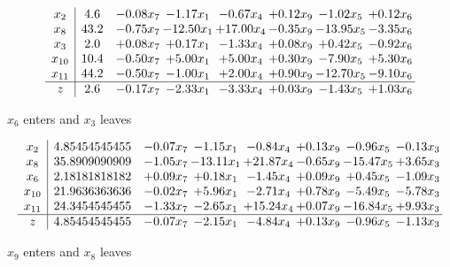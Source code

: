 \documentclass[8pt]{article}
\begin{document}
 \[\begin{array}{c| c c@{\hskip 2pt} c@{\hskip 2pt} c@{\hskip 2pt} c@{\hskip 2pt} c@{\hskip 2pt} c@{\hskip 2pt} }
 x_{2}   &  4.6 & -0.08 x_{7} & -1.17 x_{1} & -0.67 x_{4} & +  0.12 x_{9} & -1.02 x_{5} & +  0.12 x_{6}\\
 x_{8}   &  43.2 & -0.75 x_{7} & -12.50 x_{1} & + 17.00 x_{4} & -0.35 x_{9} & -13.95 x_{5} & -3.35 x_{6}\\
 x_{3}   &  2.0 & +  0.08 x_{7} & +  0.17 x_{1} & -1.33 x_{4} & +  0.08 x_{9} & +  0.42 x_{5} & -0.92 x_{6}\\
 x_{10}   &  10.4 & -0.50 x_{7} & +  5.00 x_{1} & +  5.00 x_{4} & +  0.30 x_{9} & -7.90 x_{5} & +  5.30 x_{6}\\
 x_{11}   &  44.2 & -0.50 x_{7} & -1.00 x_{1} & +  2.00 x_{4} & +  0.90 x_{9} & -12.70 x_{5} & -9.10 x_{6}\\
\hline
z    &  2.6 & -0.17 x_{7} & -2.33 x_{1} & -3.33 x_{4} & +  0.03 x_{9} & -1.43 x_{5} & +  1.03 x_{6}\\
\end{array}\]


 $ x_{6} $ enters and $ x_{3} $ leaves 

 \[\begin{array}{c| c c@{\hskip 2pt} c@{\hskip 2pt} c@{\hskip 2pt} c@{\hskip 2pt} c@{\hskip 2pt} c@{\hskip 2pt} }
 x_{2}   &  4.85454545455 & -0.07 x_{7} & -1.15 x_{1} & -0.84 x_{4} & +  0.13 x_{9} & -0.96 x_{5} & -0.13 x_{3}\\
 x_{8}   &  35.8909090909 & -1.05 x_{7} & -13.11 x_{1} & + 21.87 x_{4} & -0.65 x_{9} & -15.47 x_{5} & +  3.65 x_{3}\\
 x_{6}   &  2.18181818182 & +  0.09 x_{7} & +  0.18 x_{1} & -1.45 x_{4} & +  0.09 x_{9} & +  0.45 x_{5} & -1.09 x_{3}\\
 x_{10}   &  21.9636363636 & -0.02 x_{7} & +  5.96 x_{1} & -2.71 x_{4} & +  0.78 x_{9} & -5.49 x_{5} & -5.78 x_{3}\\
 x_{11}   &  24.3454545455 & -1.33 x_{7} & -2.65 x_{1} & + 15.24 x_{4} & +  0.07 x_{9} & -16.84 x_{5} & +  9.93 x_{3}\\
\hline
z    &  4.85454545455 & -0.07 x_{7} & -2.15 x_{1} & -4.84 x_{4} & +  0.13 x_{9} & -0.96 x_{5} & -1.13 x_{3}\\
\end{array}\]


 $ x_{9} $ enters and $ x_{8} $ leaves 
\end{document}
